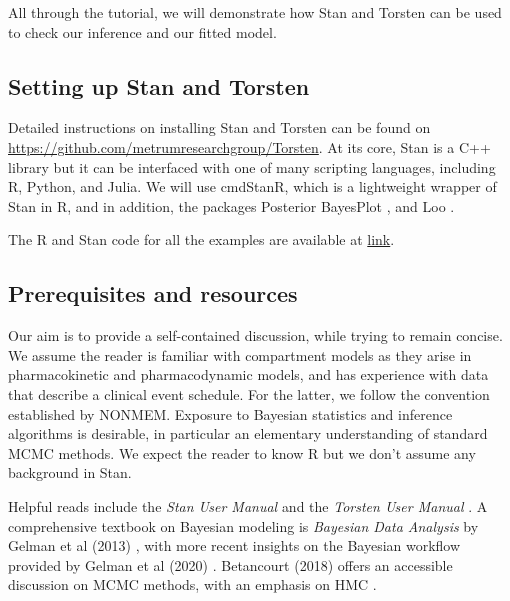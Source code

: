 All through the tutorial, we will demonstrate how Stan and Torsten can be used to check our inference and our fitted model.

\subsection{Setting up Stan and Torsten}

Detailed instructions on installing Stan and Torsten can be found on \url{https://github.com/metrumresearchgroup/Torsten}.
At its core, Stan is a C++ library but it can be interfaced with one of many scripting languages, including R, Python, and Julia.
We will use cmdStanR, which is a lightweight wrapper of Stan in R, and
in addition, the packages Posterior \cite{author:0000} BayesPlot \cite{author:0000}, and Loo \cite{author:0000}.

The R and Stan code for all the examples are available at \url{link}.

 \subsection{Prerequisites and resources}
 
 Our aim is to provide a self-contained discussion, while trying to remain concise.
 We assume the reader is familiar with compartment models as they arise in pharmacokinetic and pharmacodynamic models, and has experience with data that describe a clinical event schedule.
 For the latter, we follow the convention established by NONMEM.
 Exposure to Bayesian statistics and inference algorithms is desirable, in particular an elementary understanding of standard MCMC methods.
 We expect the reader to know R but we don't assume any background in Stan.
 
 Helpful reads include the \textit{Stan User Manual} \cite{author:0000} and the \textit{Torsten User Manual} \cite{author:0000}.
 A comprehensive textbook on Bayesian modeling is \textit{Bayesian Data Analysis} by Gelman et al (2013) \cite{Gelman:2013b}, with more recent insights on the Bayesian workflow provided by Gelman et al (2020) \cite{Gelman:2020}. 
 Betancourt (2018) offers an accessible discussion on MCMC methods, with an emphasis on HMC \cite{Betancourt:2018}.
   
 
 